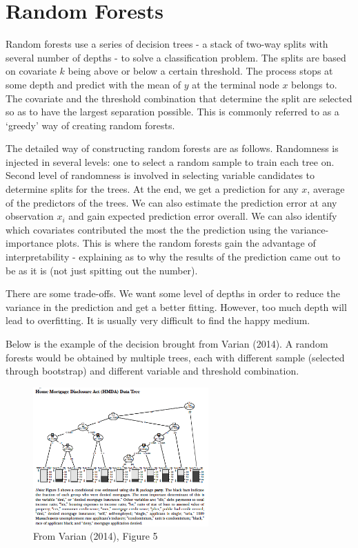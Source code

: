 \section{Random Forests}
Random forests use a series of decision trees - a stack of two-way splits with several number of depths - to solve a classification problem. The splits are based on covariate $k$ being above or below a certain threshold. The process stops at some depth and predict with the mean of $y$ at the terminal node $x$ belongs to. The covariate and the threshold combination that determine the split are selected so as to have the largest separation possible. This is commonly referred to as a `greedy' way of creating random forests.  \par
The detailed way of constructing random forests are as follows. Randomness is injected in several levels: one to select a random sample to train each tree on. Second level of randomness is involved in selecting variable candidates to determine splits for the trees. At the end, we get a prediction for any $x$, average of the predictors of the trees. We can also estimate the prediction error at any observation $x_i$ and gain expected prediction error overall. We can also identify which covariates contributed the most the the prediction using the variance-importance plots. This is where the random forests gain the advantage of interpretability - explaining as to why the results of the prediction came out to be as it is (not just spitting out the number). \par
There are some trade-offs. We want some level of depths in order to reduce the variance in the prediction and get a better fitting. However, too much depth will lead to overfitting. It is usually very difficult to find the happy medium. \par
Below is the example of the decision brought from Varian (2014). A random forests would be obtained by multiple trees, each with different sample (selected through bootstrap) and different variable and threshold combination. 
\begin{figure}[H]
\centering
\includegraphics[width=0.6\textwidth, keepaspectratio]{randomforest.png}
\caption{From Varian (2014), Figure 5}
\end{figure}\par
